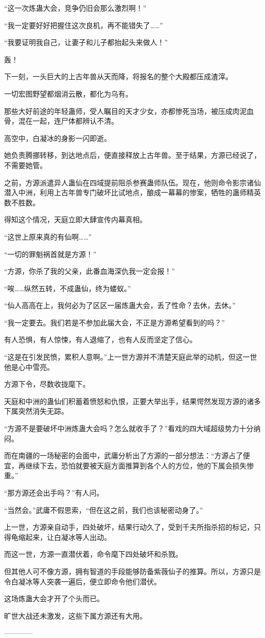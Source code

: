 \begin{this_body}
“这一次炼蛊大会，竞争仍旧会那么激烈啊！”

“我一定要好好把握住这次良机，再不能错失了……”

“我要证明我自己，让妻子和儿子都抬起头来做人！”

轰！

下一刻，一头巨大的上古年兽从天而降，将报名的整个大殿都压成渣滓。

一切宏图野望都烟消云散，都化为乌有。

那些大好前途的年轻蛊师，受人瞩目的天才少女，亦都惨死当场，被压成肉泥血骨，混在一起，连尸体都辨认不清。

高空中，白凝冰的身影一闪即逝。

她负责腾挪转移，到达地点后，便直接释放上古年兽。至于结果，方源已经说了，不需要她管。

之前，方源派遣异人蛊仙在四域提前阻杀参赛蛊师队伍。现在，他则命令影宗诸仙潜入中洲，利用上古年兽专门破坏比试地点，酿成一幕幕的惨案，牺牲的蛊师精英数不胜数。

得知这个情况，天庭立即大肆宣传内幕真相。

“这世上原来真的有仙啊……”

“一切的罪魁祸首就是方源！”

“方源，你杀了我的父亲，此番血海深仇我一定会报！”

“唉……纵然五转，不成蛊仙，终为蝼蚁。”

“仙人高高在上，我何必为了区区一届炼蛊大会，丢了性命？去休，去休。”

“我一定要去。我们若是不参加此届大会，不正是方源希望看到的吗？”

有人恐惧，有人惊悚，有人退缩了，也有人反而坚定了信心。

“这是在引发民愤，累积人意啊。”上一世方源并不清楚天庭此举的动机，但这一世他是心中雪亮。

方源下令，尽数收拢麾下。

天庭和中洲的蛊仙们积蓄着愤怒和仇恨，正要大举出手，结果愕然发现方源的诸多下属突然消失无踪。

“方源不是要破坏中洲炼蛊大会吗？怎么就收手了？”看戏的四大域超级势力十分纳闷。

而在南疆的一场秘密的会面中，武庸分析出了方源的一部分想法：“方源占了便宜，再继续下去，恐怕就要被天庭方面推算到各个人的方位，他的下属会损失惨重。”

“那方源还会出手吗？”有人问。

“当然会。”武庸不假思索，“但在这之前，我们也该秘密动身了。”

上一世，方源亲自动手，四处破坏，结果行动久了，受到千夫所指杀招的标记，只得龟缩起来，让白凝冰等人出动。

而这一世，方源一直潜伏着，命令麾下四处破坏和杀戮。

但其他人可不像方源，拥有智道的手段能够防备紫薇仙子的推算。所以，方源只是令白凝冰等人突袭一遍后，便立即命令他们潜伏。

这场炼蛊大会才开了个头而已。

旷世大战还未激发，这些下属方源还有大用。

------------

\end{this_body}

